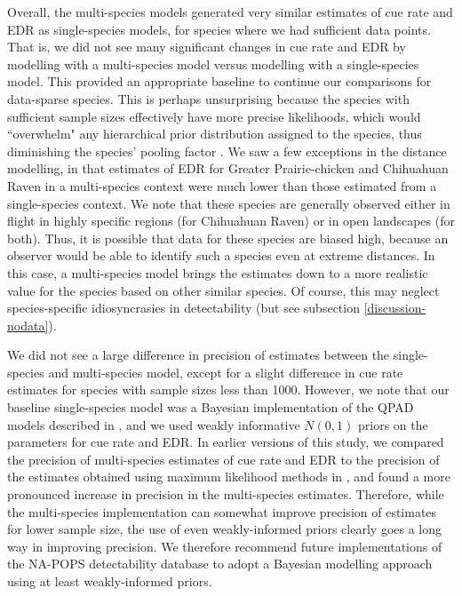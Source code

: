\par Overall, the multi-species models generated very similar estimates of cue rate and EDR as single-species models, for species where we had sufficient data points.
That is, we did not see many significant changes in cue rate and EDR by modelling with a multi-species model versus modelling with a single-species model.
This provided an appropriate baseline to continue our comparisons for data-sparse species.
This is perhaps unsurprising because the species with sufficient sample sizes effectively have more precise likelihoods, which would ``overwhelm" any hierarchical prior distribution assigned to the species, thus diminishing the species' pooling factor \citep{gelman_bayesian_2006}.
We saw a few exceptions in the distance modelling, in that estimates of EDR for Greater Prairie-chicken and Chihuahuan Raven in a multi-species context were much lower than those estimated from a single-species context.
We note that these species are generally observed either in flight in highly specific regions (for Chihuahuan Raven) or in open landscapes (for both).
Thus, it is possible that data for these species are biased high, because an observer would be able to identify such a species even at extreme distances.
In this case, a multi-species model brings the estimates down to a more realistic value for the species based on other similar species.
Of course, this may neglect species-specific idiosyncrasies in detectability (but see subsection \ref{discussion-nodata}).

\par We did not see a large difference in precision of estimates between the single-species and multi-species model, except for a slight difference in cue rate estimates for species with sample sizes less than 1000.
However, we note that our baseline single-species model was a Bayesian implementation of the QPAD models described in \citet{solymos_calibrating_2013}, and we used weakly informative $N(0,1)$ priors on the parameters for cue rate and EDR.
In earlier versions of this study, we compared the precision of multi-species estimates of cue rate and EDR to the precision of the estimates obtained using maximum likelihood methods in \citet{edwards_point_2023}, and found a more pronounced increase in precision in the multi-species estimates.
Therefore, while the multi-species implementation can somewhat improve precision of estimates for lower sample size, the use of even weakly-informed priors clearly goes a long way in improving precision.
We therefore recommend future implementations of the NA-POPS detectability database to adopt a Bayesian modelling approach using at least weakly-informed priors.


